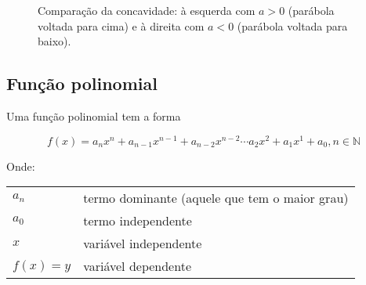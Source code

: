 \documentclass[12pt,openright,twoside,a4paper]{article}
\makeatletter
\theoremstyle{definition}
\newenvironment{condicoes}[1][Onde:]
{#1 \begin{tabular}[t]{>{$}l<{$} @{${} \implies {}$} l}}
	{\end{tabular}\\[\belowdisplayskip]}
\makeatother
\begin{document}
	\begin{figure}[h]
		\centering
		\begin{minipage}{0.48\textwidth}
			\centering
		\end{minipage}
		\hfill
		\begin{minipage}{0.48\textwidth}
			\centering
		\end{minipage}
		\caption{Comparação da concavidade: à esquerda com $a > 0$ (parábola voltada para cima) e à direita com $a < 0$ (parábola voltada para baixo).}
		\label{fig:concavidade-a}
	\end{figure}
	
	
	\pagebreak
	
	\subsection{Função polinomial}
	Uma função polinomial tem a forma
	
	\begin{equation}
		f(x) = a_nx^n + a_{n-1}x^{n-1} + a_{n-2}x^{n-2} \cdots a_2x^2 + a_1x^1 + a_0, n \in \mathbb{N} 
	\end{equation}
	
	\begin{condicoes}
		a_n & termo dominante (aquele que tem o maior grau)\\
		a_0 & termo independente\\
		x & variável independente\\
		f(x)=y & variável dependente 
	\end{condicoes}
	
\end{document}
